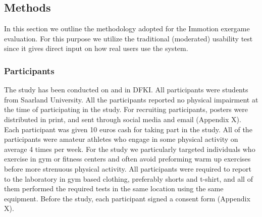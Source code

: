 \subsection{Methods} 
In this section we outline the methodology adopted for the Immotion exergame evaluation. For this purpose we utilize the traditional (moderated) usability test since it gives direct input on how real users use the system. %
%
\subsubsection{Participants}
The study has been conducted on  and  in DFKI. All participants were students from Saarland University. All the participants reported no physical impairment at the time of participating in the study. For recruiting participants, posters were distributed in print, and sent through social media and email (Appendix X). Each participant was given 10 euros cash for taking part in the study. All of the participants were amateur athletes who engage in some physical activity on average 4 times per week. For the study we particularly targeted individuals who exercise in gym or fitness centers and often avoid preforming warm up exercises before more strenuous physical activity. All participants were required to report to the laboratory in gym based clothing, preferably shorts and t-shirt, and all of them performed the required tests in the same location using the same equipment. Before the study, each participant signed a consent form (Appendix X).%
